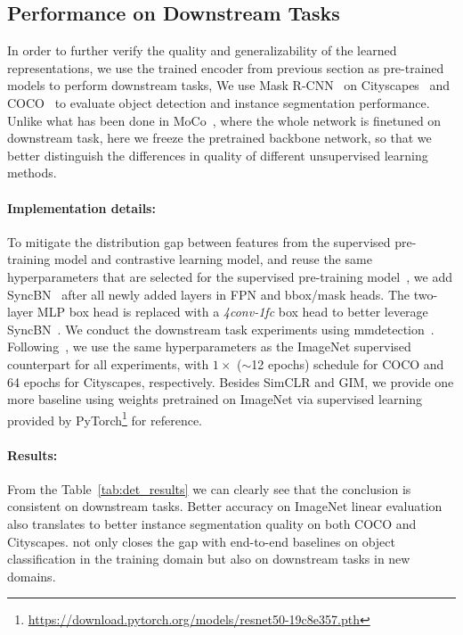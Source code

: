 \fi


\subsection{Performance on Downstream Tasks}
In order to further verify the quality and generalizability of the learned representations, we use
the trained encoder from previous section as pre-trained models to perform downstream tasks, We use
Mask R-CNN~\cite{maskrcnn} on Cityscapes~\cite{cityscapes} and COCO~\cite{mscoco} to evaluate object
detection and instance segmentation performance. Unlike what has been done in MoCo~\cite{moco},
where the whole network is finetuned on downstream task, here we freeze the pretrained backbone
network, so that we better distinguish the differences in quality of different unsupervised learning
methods.

\paragraph{Implementation details:}  To mitigate the distribution gap between features from the
supervised pre-training model and contrastive learning model, and reuse the same hyperparameters
that are selected for the supervised pre-training model~\cite{moco}, we add
SyncBN~\cite{peng2018megdet} after all newly added layers in FPN and bbox/mask heads. The two-layer
MLP box head is replaced with a {\em 4conv-1fc} box head to better leverage
SyncBN~\cite{wu2018group}. We conduct the downstream task experiments using
mmdetection~\cite{mmdetection}. Following~\cite{moco}, we use the same hyperparameters as the
ImageNet supervised counterpart for all experiments, with $1\times$ ($\sim$12 epochs) schedule for 
COCO and 64 epochs for Cityscapes, respectively. Besides SimCLR and GIM, we provide one more 
baseline using weights pretrained on ImageNet via supervised learning provided by
PyTorch\footnote{\url{https://download.pytorch.org/models/resnet50-19c8e357.pth}} for reference.

\paragraph{Results:} From the Table~\ref{tab:det_results} we can clearly see that the conclusion is
consistent on downstream tasks. Better accuracy on ImageNet linear evaluation also translates to
better instance segmentation quality on both COCO and Cityscapes. {\ours} not only closes the gap
with end-to-end baselines on object classification in the training domain but also on downstream
tasks in new domains.

